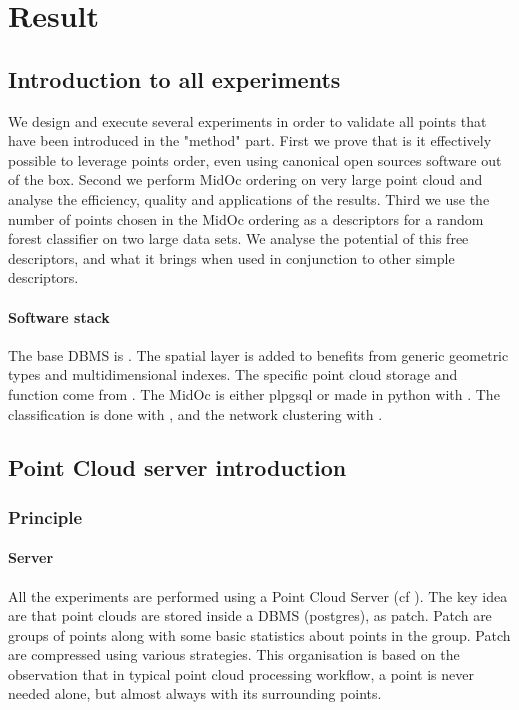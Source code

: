 

 \section{ Result }
	 \label{sec:result}
 	\subsection{Introduction to all experiments}
 		We design and execute several experiments in order to validate all points that have been introduced in the "method" part.
 		First we prove that is it effectively possible to leverage points order, even using canonical open sources software out of the box.
 		Second we perform MidOc ordering on very large point cloud and analyse the efficiency, quality and applications of the results.
 		Third we use the number of points chosen in the MidOc ordering as a descriptors for a random forest classifier on two large data sets.
 		We analyse the potential of this free descriptors, and what it brings when used in conjunction to other simple descriptors.
 		
 		\paragraph{Software stack}
	 		The base DBMS is \cite{PostgreSQL2014}. The spatial layer \cite{PostGIS2014} is added to benefits from generic geometric types and multidimensional indexes. The specific point cloud storage and function come from \cite{pgPointCloud2014}. 
	 		The MidOc is either plpgsql or made in python with \cite{SciPy2014}. 
	 		The classification is done with \cite{scikit-image}, and the network clustering with \cite{Networkx2014}.
	\subsection{Point Cloud server introduction}
		\subsubsection{Principle}
			\paragraph{Server}
				All the experiments are performed using a Point Cloud Server (cf \cite{Cura2014}).
				The key idea are that point clouds are stored inside a DBMS (postgres), as patch. Patch are groups of points along with some basic statistics about points in the group. Patch are compressed using various strategies.
				This organisation is based on the observation that in typical point cloud processing workflow, a point is never needed alone, but almost always with its surrounding points.
			
